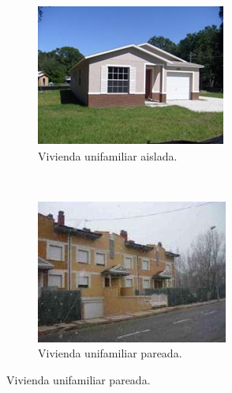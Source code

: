 \documentclass[11pt,letterpaper]{report}
\begin{document}
	\begin{figure}[ht]
    \centering
    \begin{subfigure}[b]{0.44\textwidth}
        \includegraphics[width=\textwidth]{imagenes/aislada.png}
        \caption{Vivienda unifamiliar aislada. }
        \label{fig:aislada}
    \end{subfigure}
    ~ %
    \begin{subfigure}[b]{0.44\textwidth}
        \includegraphics[width=\textwidth]{imagenes/pareada.png}
        \caption{Vivienda unifamiliar pareada.}
        \label{fig:pareada}
    \end{subfigure}

\end{figure}
\end{document}
